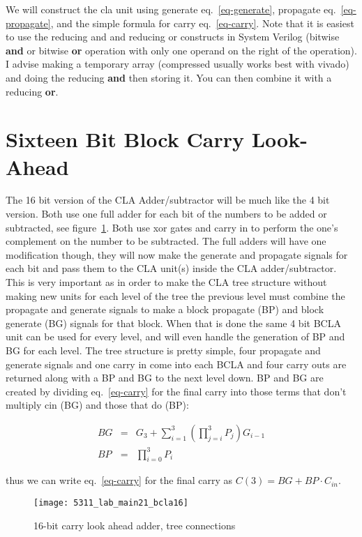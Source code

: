 We will construct the cla unit using generate eq.~\ref{eq-generate}, propagate eq.~\ref{eq-propagate}, and the simple formula for carry eq.~\ref{eq-carry}. Note that it is easiest to use the reducing and and reducing or constructs in System Verilog (bitwise \textbf{and} or bitwise \textbf{or} operation with only one operand on the right of the operation). I advise making a temporary array (compressed usually works best with vivado) and doing the reducing \textbf{and} then storing it.  You can then combine it with a reducing \textbf{or}.

\section{Sixteen Bit Block Carry Look-Ahead}

The 16 bit version of the CLA Adder/subtractor will be much like the 4 bit version. Both use one full adder for each bit of the numbers to be added or subtracted, see figure~\ref{fig-16bitcla}. Both use xor gates and carry in to perform the one's complement on the number to be subtracted. The full adders will have one modification though, they will now make the generate and propagate signals for each bit and pass them to the CLA unit(s) inside the CLA adder/subtractor. This is very important as in order to make the CLA tree structure without making new units for each level of the tree the previous level must combine the propagate and generate signals to make a block propagate (BP) and block generate (BG) signals for that block. When that is done the same 4 bit BCLA unit can be used for every level, and will even handle the generation of BP and BG for each level. The tree structure is pretty simple, four propagate and generate signals and one carry in come into each BCLA and four carry outs are returned along with a BP and BG to the next level down. BP and BG are created by dividing eq.~\ref{eq-carry} for the final carry into those terms that don't multiply cin (BG) and those that do (BP):

\begin{eqnarray}
BG &=& G_3 + \sum_{i=1}^3\left(\prod_{j=i}^{3} P_j \right)G_{i-1}\\
BP &=& \prod_{i=0}^{3} P_i
\end{eqnarray}

thus we can write eq.~\ref{eq-carry} for the final carry as $C(3)=BG+BP\cdot C_{in}$.

\begin{figure}
  \centering
  \texttt{[image: 5311\_lab\_main21\_bcla16]}
  \caption{16-bit carry look ahead adder, tree connections}\label{fig-16bitcla}
\end{figure}

